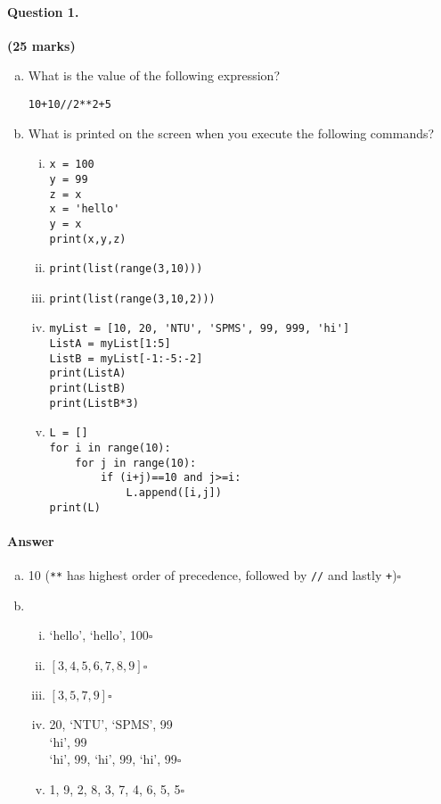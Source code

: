 \documentclass[12pt]{article}
\newcommand{\EOQ}{\hfill $\square$}
\begin{document}
\paragraph{Question 1.}\hfill {\bf (25 marks)}
\begin{enumerate}[(a)]
\item What is the value of the following expression?
\begin{verbatim}
10+10//2**2+5
\end{verbatim}
\item What is printed on the screen when you execute the following commands?
\begin{enumerate}[(i)]
\item \begin{verbatim}
x = 100
y = 99
z = x
x = 'hello'
y = x
print(x,y,z)
\end{verbatim}
\item \begin{verbatim}
print(list(range(3,10)))\end{verbatim}
\item \begin{verbatim}print(list(range(3,10,2)))\end{verbatim}
\item \begin{verbatim}myList = [10, 20, 'NTU', 'SPMS', 99, 999, 'hi']
ListA = myList[1:5]
ListB = myList[-1:-5:-2]
print(ListA)
print(ListB)
print(ListB*3)
\end{verbatim}
\item \begin{verbatim}
L = []
for i in range(10):
    for j in range(10):
        if (i+j)==10 and j>=i:
            L.append([i,j])
print(L)
\end{verbatim}
\end{enumerate}
\end{enumerate}
\paragraph{Answer}
\begin{enumerate}[(a)]
\item 10 (\verb|**| has highest order of precedence, followed by \verb|//| and lastly \verb|+|)\EOQ
\item \begin{enumerate}[(i)]

\item `hello', `hello', 100\EOQ
\item $[3,4,5,6,7,8,9]$\EOQ
\item $[3,5,7,9]$\EOQ
\item \text{[}20, `NTU', `SPMS', 99\text{]}\\\text{[}`hi', 99\text{]}\\\text{[}`hi', 99, `hi', 99, `hi', 99\text{]}\EOQ
\item \text{[}\text{[}1, 9\text{]}, \text{[}2, 8\text{]}, \text{[}3, 7\text{]}, \text{[}4, 6\text{]}, \text{[}5, 5\text{]}\text{]}\EOQ
\end{enumerate}
\end{enumerate}
\end{document}
